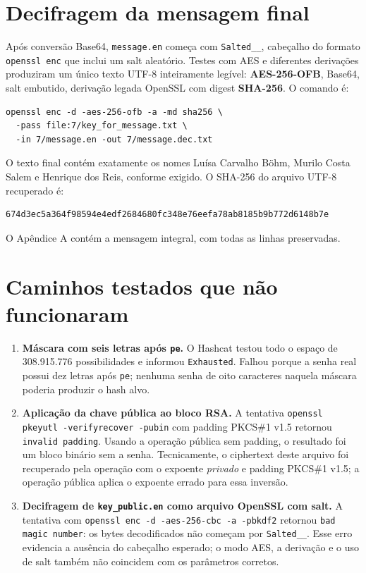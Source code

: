 \documentclass[11pt,a4paper]{article}
\newcommand{\code}[1]{\texttt{#1}}
\begin{document}
\section{Decifragem da mensagem final}

Após conversão Base64, \code{message.en} começa com \code{Salted\_\_}, cabeçalho do formato \code{openssl enc} que inclui um salt aleatório. Testes com AES e diferentes derivações produziram um único texto UTF-8 inteiramente legível: \textbf{AES-256-OFB}, Base64, salt embutido, derivação legada OpenSSL com digest \textbf{SHA-256}. O comando é:
\begin{Verbatim}[fontsize=\scriptsize]
openssl enc -d -aes-256-ofb -a -md sha256 \
  -pass file:7/key_for_message.txt \
  -in 7/message.en -out 7/message.dec.txt
\end{Verbatim}
O texto final contém exatamente os nomes Luísa Carvalho Böhm, Murilo Costa Salem e Henrique dos Reis, conforme exigido. O SHA-256 do arquivo UTF-8 recuperado é:
\begin{Verbatim}[fontsize=\scriptsize]
674d3ec5a364f98594e4edf2684680fc348e76eefa78ab8185b9b772d6148b7e
\end{Verbatim}
O Apêndice A contém a mensagem integral, com todas as linhas preservadas.

\section{Caminhos testados que não funcionaram}

\begin{enumerate}
\item \textbf{Máscara com seis letras após \code{pe}.} O Hashcat testou todo o espaço de 308.915.776 possibilidades e informou \code{Exhausted}. Falhou porque a senha real possui dez letras após \code{pe}; nenhuma senha de oito caracteres naquela máscara poderia produzir o hash alvo.
\item \textbf{Aplicação da chave pública ao bloco RSA.} A tentativa \code{openssl pkeyutl -verifyrecover -pubin} com padding PKCS\#1 v1.5 retornou \code{invalid padding}. Usando a operação pública sem padding, o resultado foi um bloco binário sem a senha. Tecnicamente, o ciphertext deste arquivo foi recuperado pela operação com o expoente \emph{privado} e padding PKCS\#1 v1.5; a operação pública aplica o expoente errado para essa inversão.
\item \textbf{Decifragem de \code{key\_public.en} como arquivo OpenSSL com salt.} A tentativa com \code{openssl enc -d -aes-256-cbc -a -pbkdf2} retornou \code{bad magic number}: os bytes decodificados não começam por \code{Salted\_\_}. Esse erro evidencia a ausência do cabeçalho esperado; o modo AES, a derivação e o uso de salt também não coincidem com os parâmetros corretos.
\end{enumerate}
\end{document}
